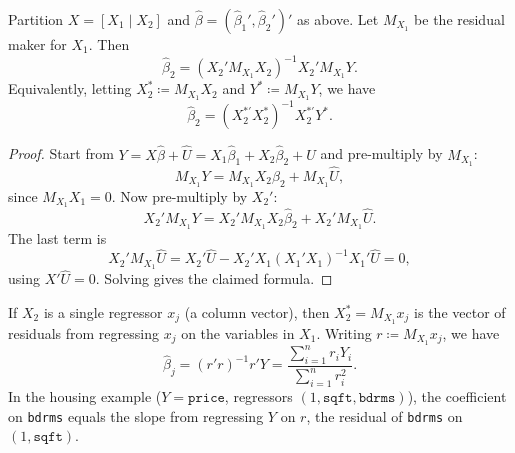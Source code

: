 \begin{proposition}
	Partition $X=[X_1\mid X_2]$ and $\hat{\beta}=(\hat{\beta}_1',\hat{\beta}_2')'$ as above.
	Let $M_{X_1}$ be the residual maker for $X_1$.
	Then
	\[
		\hat{\beta}_2 = (X_2' M_{X_1} X_2)^{-1} X_2' M_{X_1} Y.
	\]
	Equivalently, letting $X_2^* \coloneqq M_{X_1}X_2$ and $Y^* \coloneqq M_{X_1}Y$, we have
	\[
		\hat{\beta}_2 = (X_2^{*'}X_2^*)^{-1} X_2^{*'} Y^*.
	\]
\end{proposition}
\begin{proof}
	Start from $Y=X\hat{\beta}+\hat{U}=X_1\hat{\beta}_1+X_2\hat{\beta}_2+\hat{U}$ and pre-multiply by $M_{X_1}$:
	\[
		M_{X_1}Y = M_{X_1}X_2\hat{\beta}_2 + M_{X_1}\hat{U},
	\]
	since $M_{X_1}X_1=0$.
	Now pre-multiply by $X_2'$:
	\[
		X_2'M_{X_1}Y = X_2'M_{X_1}X_2\hat{\beta}_2 + X_2'M_{X_1}\hat{U}.
	\]
	The last term is
	\[
		X_2'M_{X_1}\hat{U}
		= X_2'\hat{U} - X_2'X_1(X_1'X_1)^{-1}X_1'\hat{U}
		= 0,
	\]
	using $X'\hat{U}=0$.
	Solving gives the claimed formula.
\end{proof}

\begin{remark}
	If $X_2$ is a single regressor $x_j$ (a column vector), then $X_2^*=M_{X_1}x_j$ is the vector of residuals from regressing $x_j$ on the variables in $X_1$.
	Writing $r \coloneqq M_{X_1}x_j$, we have
	\[
		\hat{\beta}_j = (r'r)^{-1}r'Y = \frac{\sum_{i=1}^n r_i Y_i}{\sum_{i=1}^n r_i^2}.
	\]
	In the housing example ($Y=\texttt{price}$, regressors $(1,\texttt{sqft},\texttt{bdrms})$), the coefficient on \texttt{bdrms} equals the slope from regressing $Y$ on $r$, the residual of \texttt{bdrms} on $(1,\texttt{sqft})$.
\end{remark}

